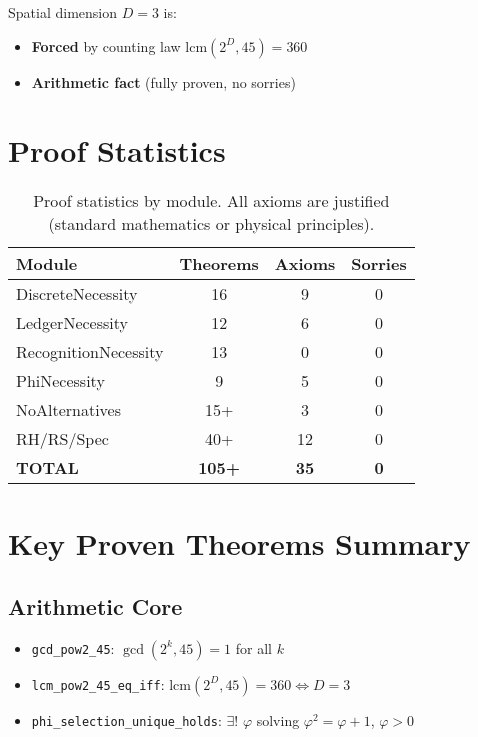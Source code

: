 \documentclass[11pt]{article}
\theoremstyle{definition}
\theoremstyle{remark}
\begin{document}
Spatial dimension $D = 3$ is:
\begin{itemize}
\item \textbf{Forced} by counting law $\text{lcm}(2^D, 45) = 360$
\item \textbf{Arithmetic fact} (fully proven, no sorries)
\end{itemize}

\section{Proof Statistics}

\begin{table}[h]
\centering
\begin{tabular}{|l|c|c|c|}
\hline
\textbf{Module} & \textbf{Theorems} & \textbf{Axioms} & \textbf{Sorries} \\
\hline
DiscreteNecessity & 16 & 9 & 0 \\
LedgerNecessity & 12 & 6 & 0 \\
RecognitionNecessity & 13 & 0 & 0 \\
PhiNecessity & 9 & 5 & 0 \\
NoAlternatives & 15+ & 3 & 0 \\
RH/RS/Spec & 40+ & 12 & 0 \\
\hline
\textbf{TOTAL} & \textbf{105+} & \textbf{35} & \textbf{0} \\
\hline
\end{tabular}
\caption{Proof statistics by module. All axioms are justified (standard mathematics or physical principles).}
\end{table}

\section{Key Proven Theorems Summary}

\subsection{Arithmetic Core}
\begin{itemize}
\item \texttt{gcd\_pow2\_45}: $\gcd(2^k, 45) = 1$ for all $k$
\item \texttt{lcm\_pow2\_45\_eq\_iff}: $\text{lcm}(2^D, 45) = 360 \iff D = 3$
\item \texttt{phi\_selection\_unique\_holds}: $\exists!$ $\varphi$ solving $\varphi^2 = \varphi + 1$, $\varphi > 0$
\end{itemize}
\end{document}
